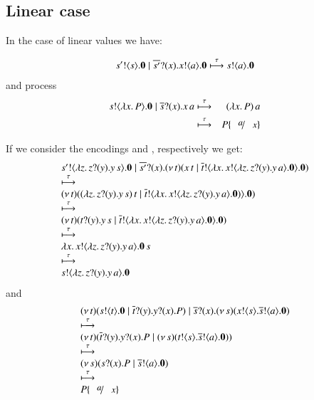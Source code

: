 \subsection{Linear case}

In the case of linear values we have:

\begin{eqnarray*}
	s' ! \langle s \rangle . \mathbf{0} \;|\; \overline{s'} ? (x) . x ! \langle a \rangle . \mathbf{0}
	\stackrel{\tau}{\longmapsto}
	s ! \langle a \rangle . \mathbf{0}
\end{eqnarray*}
and \HO process
\begin{eqnarray*}
	\bout{s}{\abs{x}{P}} \inact \Par \binp{\dual{s}}{x} \appl{x}{a}
	&\hby{\tau}&
	\appl{(\abs{x}{P})}{a}\\
	&\hby{\tau}&
	P \subst{a}{x}
\end{eqnarray*}

If we consider the encodings \HO and \sessp, respectively
we get:
\[
\begin{array}{l}
	s' ! \langle \lambda z.\,z ? (y) . y\, {s} \rangle . \mathbf{0} \;|\; \overline{s'} ? (x) . (\nu\, t)(x\, {t} \;|\; \overline{t} ! \langle \lambda x.\,x ! \langle \lambda z.\,z ? (y) . y\, {a} \rangle . \mathbf{0} \rangle . \mathbf{0})\\
	\stackrel{\tau}{\longmapsto}\\
	(\nu\, t)((\lambda z.\,z ? (y) . y\, {s})\, {t} \;|\; \overline{t} ! \langle \lambda x.\,x ! \langle \lambda z.\,z ? (y) . y\, {a} \rangle . \mathbf{0}) \rangle . \mathbf{0})\\
	\stackrel{\tau}{\longmapsto}\\
	(\nu\, t)(t ? (y) . y\, {s} \;|\; \overline{t} ! \langle \lambda x.\,x ! \langle \lambda z.\,z ? (y) . y\, {a} \rangle . \mathbf{0} \rangle . \mathbf{0})\\
	\stackrel{\tau}{\longmapsto}\\
	\lambda x.\,x ! \langle \lambda z.\,z ? (y) . y\, {a} \rangle . \mathbf{0}\, {s}
	\\
	\stackrel{\tau}{\longmapsto}
	\\
	s ! \langle \lambda z.\,z ? (y) . y\, {a} \rangle . \mathbf{0}
\end{array}
\]
and 
\[
\begin{array}{l}
	\newsp{t}{\bout{s}{t} \inact \Par \binp{\dual{t}}{y} \binp{y}{x} P} \Par \binp{\dual{s}}{x} \newsp{s}{\bout{x}{s} \bout{\dual{s}}{a} \inact}
	\\
	\hby{\tau}
	\\
	\newsp{t}{\binp{\dual{t}}{y} \binp{y}{x} P \Par \newsp{s}{\bout{t}{s} \bout{\dual{s}}{a} \inact}}
	\\
	\hby{\tau}
	\\
	\newsp{s}{\binp{s}{x} P \Par \bout{\dual{s}}{a} \inact}
	\\
	\hby{\tau}
	\\
	P\subst{a}{x}
\end{array}
\]
